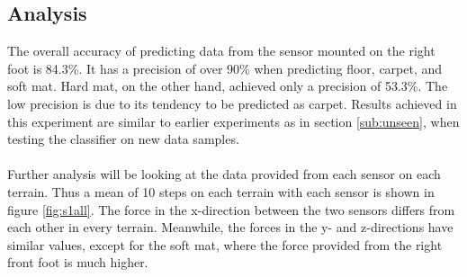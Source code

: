 \documentclass[USenglish]{ifimaster}  %
\begin{document}
\subsection{Analysis} 	
The overall accuracy of predicting data from the sensor mounted on the right foot is 84.3\%. It has a precision of over 90\% when predicting floor, carpet, and soft mat. Hard mat, on the other hand, achieved only a precision of 53.3\%. The low precision is due to its tendency to be predicted as carpet. Results achieved in this experiment are similar to earlier experiments as in section \ref{sub:unseen}, when testing the classifier on new data samples. 
\\
\\
Further analysis will be looking at the data provided from each sensor on each terrain. Thus a mean of 10 steps on each terrain with each sensor is shown in figure \ref{fig:s1all}. The force in the x-direction between the two sensors differs from each other in every terrain. Meanwhile, the forces in the y- and z-directions have similar values, except for the soft mat, where the force provided from the right front foot is much higher.
\end{document}
